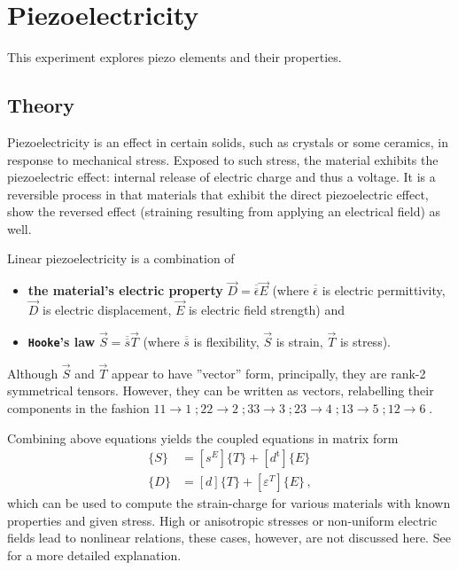 \chapter{Piezoelectricity}
This experiment explores piezo elements and their properties.

\section{Theory}
Piezoelectricity is an effect in certain solids, such as crystals or some ceramics, in response to mechanical stress.
Exposed to such stress, the material exhibits the piezoelectric effect: internal release of electric charge and thus a voltage.
It is a reversible process in that materials that exhibit the direct piezoelectric effect, show the reversed effect (straining resulting from applying an electrical field) as well.

Linear piezoelectricity is a combination of
\begin{itemize}
	\item \textbf{the material's electric property} $\vec{D}=\overline{\overline{\epsilon}}\vec{E}$ (where $\overline{\overline{\epsilon}}$ is electric permittivity, $\vec{D}$ is electric displacement, $\vec{E}$ is electric field strength) and
	\item \textbf{\texttt{Hooke}'s law} $\vec{S}=\overline{\overline{s}}\vec{T}$ (where $\overline{\overline{s}}$ is flexibility, $\vec{S}$ is strain, $\vec{T}$ is stress).
\end{itemize}
Although $\vec{S}$ and $\vec{T}$ appear to have ''vector'' form, principally, they are rank-2 symmetrical tensors.
However, they can be written as vectors, relabelling their components in the fashion $11 \rightarrow 1 \;;  22 \rightarrow 2 \;;  33 \rightarrow 3 \;;  23 \rightarrow 4 \;;  13 \rightarrow 5 \; ;  12 \rightarrow 6 \;$.

Combining above equations yields the coupled equations in matrix form\cite{IEEEPiezo}
\begin{align*}
	\{S\} &= \left [s^E \right ]\{T\}+[d^\mathrm{t}]\{E\} \\
	\{D\} &= [d]\{T\}+\left [ \varepsilon^T \right ] \{E\} \,,
\end{align*}
which can be used to compute the strain-charge for various materials with known properties and given stress.
High or anisotropic stresses or non-uniform electric fields lead to nonlinear relations, these cases, however, are not discussed here.
See \cite{piezo} for a more detailed explanation.
\clearpage
